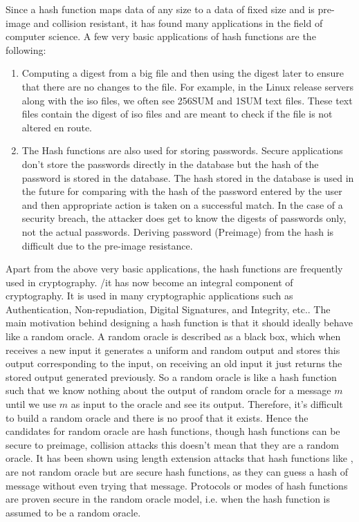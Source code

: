 Since a hash function maps data of any size to a data of fixed size and is pre-image and collision resistant, it has found many applications in the field of computer science. A few very basic applications of hash functions are the following:
\begin{enumerate}
    \item Computing a digest from a big file and then using the digest later to ensure that there are no changes to the file. For example, in the Linux release servers along with the iso files, we often see \SHA256SUM and \SHA1SUM text files. These text files contain the digest of iso files and are meant to check if the file is not altered en route.
    
    \item The Hash functions are also used for storing passwords. Secure applications don't store the passwords directly in the database but the hash of the password is stored in the database. The hash stored in the database is used in the future for comparing with the hash of the password entered by the user and then appropriate action is taken on a successful match. In the case of a security breach, the attacker does get to know the digests of passwords only, not the actual passwords. Deriving password (Preimage) from the hash is difficult due to the pre-image resistance.
\end{enumerate}

Apart from the above very basic applications, the hash functions are frequently used in cryptography. /it has now become an integral component of cryptography. It is used in many cryptographic applications such as Authentication, Non-repudiation, Digital Signatures, and Integrity, etc.. The main motivation behind designing a hash function is that it should ideally behave like a random oracle. A random oracle is described as a black box, which when receives a new input it generates a uniform and random output and stores this output corresponding to the input, on receiving an old input it just returns the stored output generated previously. So a random oracle is like a hash function such that we know nothing about the output of random oracle for a message $m$ until we use $m$ as input to the oracle and see its output. Therefore, it's difficult to build a random oracle and there is no proof that it exists. Hence the candidates for random oracle are hash functions, though hash functions can be secure to preimage, collision attacks this doesn't mean that they are a random oracle. It has been shown using length extension attacks that hash functions like ,  are not random oracle but are secure hash functions, as they can guess a hash of message without even trying that message. Protocols or modes of hash functions are proven secure in the random oracle model, i.e. when the hash function is assumed to be a random oracle.

